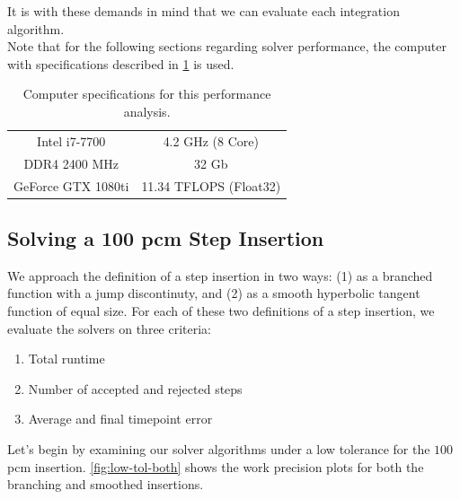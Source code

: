 \documentclass[review,onefignum,onetabnum]{siamart171218}
\begin{document}
It is with these demands in mind that we can evaluate each integration algorithm.\\

Note that for the following sections regarding solver performance, the computer
with specifications described in \cref{tab:computer-specs} is used.

\begin{table}[htb]
  \begin{center}
    \begin{tabular}{c|c}
      Intel i7-7700&4.2 GHz (8 Core)\\
      DDR4 2400 MHz&32 Gb\\
      GeForce GTX 1080ti&11.34 TFLOPS (Float32)\\
    \end{tabular}
  \end{center}
  \caption{Computer specifications for this performance analysis.}
  \label{tab:computer-specs}
\end{table}

\subsection{Solving a 100 pcm Step Insertion}

We approach the definition of a step insertion in two ways: (1) as a branched
function with a jump discontinuty, and (2) as a smooth hyperbolic tangent function
of equal size. For each of these two definitions of a step insertion, we
evaluate the solvers on three criteria: \\


\begin{enumerate}
  \item Total runtime
  \item Number of accepted and rejected steps
  \item Average and final timepoint error\\
\end{enumerate}


Let's begin by examining our solver algorithms under a low tolerance for the $100$
pcm insertion. \cref{fig:low-tol-both} shows the work precision plots for
both the branching and smoothed insertions.
\end{document}
